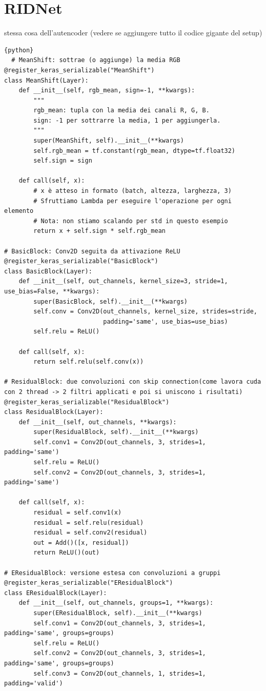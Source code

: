 \documentclass[12pt,a4paper,openright,twoside]{book}
\newcommand{\TODOComment}[1]{}
\begin{document}
\TODOComment{Modificare il dataset per i cosi successivi}

\section{RIDNet}
stessa cosa dell'autencoder (vedere se aggiungere tutto il codice gigante del setup)
\begin{lstlisting}{python}
  # MeanShift: sottrae (o aggiunge) la media RGB
@register_keras_serializable("MeanShift")
class MeanShift(Layer):
    def __init__(self, rgb_mean, sign=-1, **kwargs):
        """
        rgb_mean: tupla con la media dei canali R, G, B.
        sign: -1 per sottrarre la media, 1 per aggiungerla.
        """
        super(MeanShift, self).__init__(**kwargs)
        self.rgb_mean = tf.constant(rgb_mean, dtype=tf.float32)
        self.sign = sign

    def call(self, x):
        # x è atteso in formato (batch, altezza, larghezza, 3)
        # Sfruttiamo Lambda per eseguire l'operazione per ogni elemento
        # Nota: non stiamo scalando per std in questo esempio
        return x + self.sign * self.rgb_mean

# BasicBlock: Conv2D seguita da attivazione ReLU
@register_keras_serializable("BasicBlock")
class BasicBlock(Layer):
    def __init__(self, out_channels, kernel_size=3, stride=1, use_bias=False, **kwargs):
        super(BasicBlock, self).__init__(**kwargs)
        self.conv = Conv2D(out_channels, kernel_size, strides=stride,
                           padding='same', use_bias=use_bias)
        self.relu = ReLU()

    def call(self, x):
        return self.relu(self.conv(x))

# ResidualBlock: due convoluzioni con skip connection(come lavora cuda con 2 thread -> 2 filtri applicati e poi si uniscono i risultati)
@register_keras_serializable("ResidualBlock")
class ResidualBlock(Layer):
    def __init__(self, out_channels, **kwargs):
        super(ResidualBlock, self).__init__(**kwargs)
        self.conv1 = Conv2D(out_channels, 3, strides=1, padding='same')
        self.relu = ReLU()
        self.conv2 = Conv2D(out_channels, 3, strides=1, padding='same')

    def call(self, x):
        residual = self.conv1(x)
        residual = self.relu(residual)
        residual = self.conv2(residual)
        out = Add()([x, residual])
        return ReLU()(out)

# EResidualBlock: versione estesa con convoluzioni a gruppi
@register_keras_serializable("EResidualBlock")
class EResidualBlock(Layer):
    def __init__(self, out_channels, groups=1, **kwargs):
        super(EResidualBlock, self).__init__(**kwargs)
        self.conv1 = Conv2D(out_channels, 3, strides=1, padding='same', groups=groups)
        self.relu = ReLU()
        self.conv2 = Conv2D(out_channels, 3, strides=1, padding='same', groups=groups)
        self.conv3 = Conv2D(out_channels, 1, strides=1, padding='valid')


\end{lstlisting}
\end{document}

